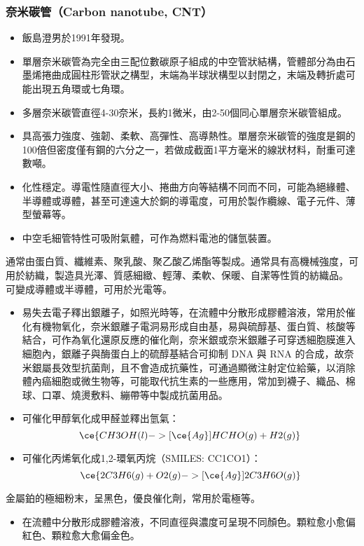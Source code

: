 \documentclass[a4paper,12pt]{report}
\begin{document}
\begin{itemize}
\begin{itemize}
\begin{itemize}
\subsubsection{奈米碳管（Carbon nanotube, CNT）}
\begin{itemize}
\item 飯島澄男於1991年發現。
\item 單層奈米碳管為完全由三配位數碳原子組成的中空管狀結構，管體部分為由石墨烯捲曲成圓柱形管狀之構型，末端為半球狀構型以封閉之，末端及轉折處可能出現五角環或七角環。
\item 多層奈米碳管直徑4-30奈米，長約1微米，由2-50個同心單層奈米碳管組成。
\item 具高張力強度、強韌、柔軟、高彈性、高導熱性。單層奈米碳管的強度是鋼的100倍但密度僅有鋼的六分之一，若做成截面1平方毫米的線狀材料，耐重可達數噸。
\item 化性穩定。導電性隨直徑大小、捲曲方向等結構不同而不同，可能為絕緣體、半導體或導體，甚至可達遠大於銅的導電度，可用於製作纜線、電子元件、薄型螢幕等。
\item 中空毛細管特性可吸附氣體，可作為燃料電池的儲氫裝置。
\end{itemize}
通常由蛋白質、纖維素、聚乳酸、聚乙酸乙烯酯等製成。通常具有高機械強度，可用於紡織，製造具光澤、質感細緻、輕薄、柔軟、保暖、自潔等性質的紡織品。
可變成導體或半導體，可用於光電等。
\begin{itemize}
\item 易失去電子釋出銀離子，如照光時等，在流體中分散形成膠體溶液，常用於催化有機物氧化，奈米銀離子電洞易形成自由基，易與硫醇基、蛋白質、核酸等結合，可作為氧化還原反應的催化劑，奈米銀或奈米銀離子可穿透細胞膜進入細胞內，銀離子與酶蛋白上的硫醇基結合可抑制 DNA 與 RNA 的合成，故奈米銀屬長效型抗菌劑，且不會造成抗藥性，可通過顯微注射定位給藥，以消除體內癌細胞或微生物等，可能取代抗生素的一些應用，常加到襪子、織品、棉球、口罩、燒燙敷料、繃帶等中製成抗菌用品。
\item 可催化甲醇氧化成甲醛並釋出氫氣：
\[\ce{CH3OH(l) ->[\ce{Ag}] HCHO(g) + H2(g)}\]
\item 可催化丙烯氧化成1,2-環氧丙烷（SMILES: CC1CO1）：
\[\ce{2C3H6(g) + O2(g) ->[\ce{Ag}] 2C3H6O(g)}\]
\end{itemize}
金屬鉑的極細粉末，呈黑色，優良催化劑，常用於電極等。
\begin{itemize}
\item 在流體中分散形成膠體溶液，不同直徑與濃度可呈現不同顏色。顆粒愈小愈偏紅色、顆粒愈大愈偏金色。

\end{itemize}
\end{itemize}
\end{itemize}
\end{itemize}
\end{document}
